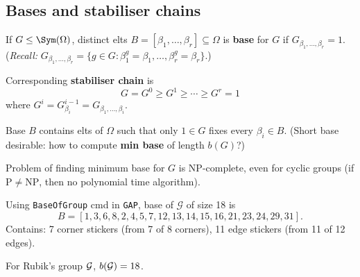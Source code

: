 \subsection{Bases and stabiliser chains}

\begin{slide}
    \begin{definition}
        \vspace{0pt}
        If $G \leq \Sym(\Omega)$, distinct elts $B = [\beta_1,\dotsc,\beta_r] \subseteq \Omega$ is \textbf{base} for $G$ if $G_{\beta_1,\dotsc,\beta_r} = 1$. (\textit{Recall:} $G_{\beta_1,\dotsc,\beta_r} = \{g \in G : \beta_1^g = \beta_1,\dotsc,\beta_r^g = \beta_r\}$.) \pause

        Corresponding \textbf{stabiliser chain} is
        \[G = G^0 \geq G^1 \geq \dotsb \geq G^r = 1\]
        where $G^i = G^{i-1}_{\beta_i} = G_{\beta_1,\dotsc,\beta_i}$.
    \end{definition} \pause

    Base $B$ contains elts of $\Omega$ such that only $1 \in G$ fixes every $\beta_i \in B$. (Short base desirable: how to compute \textbf{min base} of length $b(G)$?) \pause

    \begin{theorem}[Blaha, 1992]
        \vspace{0pt}
        Problem of finding minimum base for $G$ is NP-complete, even for cyclic groups (if $\mathrm{P} \neq \mathrm{NP}$, then no polynomial time algorithm).
    \end{theorem}
\end{slide}

\begin{slide}
    \begin{example}
        \vspace{0pt}
        Using \texttt{BaseOfGroup} cmd in \texttt{GAP}, base of $\mathcal{G}$ of size 18 is
        $$B = [ 1, 3, 6, 8, 2, 4, 5, 7, 12, 13, 14, 15, 16, 21, 23, 24, 29, 31 ].$$ \pause
        Contains: 7 corner stickers (from 7 of 8 corners), 11 edge stickers (from 11 of 12 edges).
    \end{example} \pause

    \begin{theorem}
        \vspace{0pt}
        For Rubik's group $\mathcal{G}$, $b(\mathcal{G}) = 18$.
    \end{theorem}
\end{slide}

